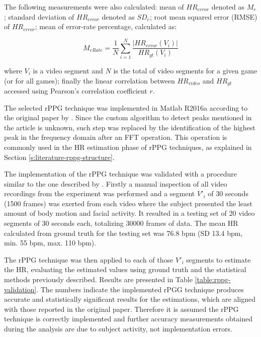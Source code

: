 The following measurements were also calculated: mean of $HR_{error}$ denoted as $M_e$; standard deviation of $HR_{error}$ denoted as $SD_e$; root mean squared error (RMSE) of $HR_{error}$; mean of error-rate percentage, calculated as:

\begin{equation}
\label{eqn:merate}
M_{eRate} = \frac{1}{N} \sum_{i=1}^{N}\frac{|HR_{error}(V_i)|}{HR_{gt}(V_i)}
\end{equation}

where $V_i$ is a video segment and $N$ is the total of video segments for a given game (or for all games); finally the linear correlation between $HR_{video}$ and $HR_{gt}$ accessed using Pearson's correlation coefficient $r$.


The selected rPPG technique was implemented in Matlab R2016a according to the original paper by \textcite{poh2011advancements}. Since the custom algorithm to detect peaks mentioned in the article is unknown, such step was replaced by the identification of the highest peak in the frequency domain after an FFT operation. This operation is commonly used in the HR estimation phase of rPPG techniques, as explained in Section \ref{s:literature-rppg-structure}.

The implementation of the rPPG technique was validated with a procedure similar to the one described by \textcite{li2014remote}. Firstly a manual inspection of all video recordings from the experiment was performed and a segment $V'_i$ of 30 seconds (1500 frames) was exerted from each video where the subject presented the least amount of body motion and facial activity. It resulted in a testing set of 20 video segments of 30 seconds each, totalizing 30000 frames of data. The mean HR calculated from ground truth for the testing set was 76.8 bpm (SD 13.4 bpm, min. 55 bpm, max. 110 bpm).

The rPPG technique was then applied to each of those $V'_i$ segments to estimate the HR, evaluating the estimated values using ground truth and the statistical methods previously described. Results are presented in Table \ref{table:rppg-validation}. The numbers indicate the implemented rPGG technique produces accurate and statistically significant results for the estimations, which are aligned with those reported in the original paper. Therefore it is assumed the rPPG technique is correctly implemented and further accuracy measurements obtained during the analysis are due to subject activity, not implementation errors.


